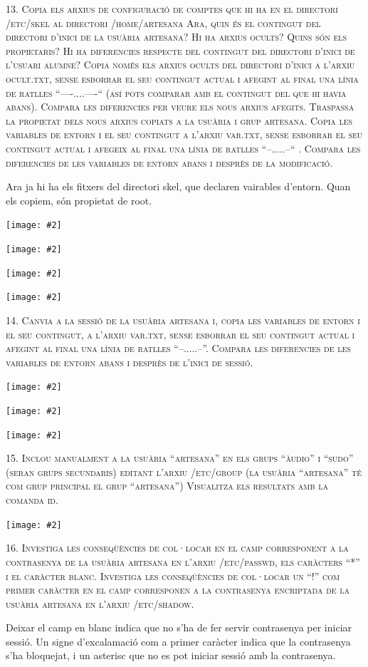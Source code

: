 \documentclass[a4paper,12pt]{article}
\newcommand{\mygraphic}[2][width=\textwidth]{\begin{center}
		\centering\texttt{[image: \#2]}\par
\end{center}}
\begin{document}
\newpage
\textsc{13. Copia els arxius de configuració de comptes que hi ha en el directori /etc/skel al directori /home/artesana Ara, quin és el contingut del directori d’inici de la usuària artesana? Hi ha arxius ocults? Quins són els propietaris? Hi ha diferencies respecte del contingut del directori d’inici de l’usuari alumne? Copia només els arxius ocults del directori d’inici a l’arxiu ocult.txt, sense esborrar el seu contingut actual i afegint al final una línia de ratlles “----....----“ (así pots comparar amb el contingut del que hi havia abans). Compara les diferencies per veure els nous arxius afegits. Traspassa la propietat dels nous arxius copiats a la usuària i grup artesana. Copia les variables de entorn i el seu contingut a l’arxiu var.txt, sense esborrar el seu contingut actual i afegeix al final una línia de ratlles “--.....--“ . Compara les diferencies de les variables de entorn abans i desprès de la modificació.}

Ara ja hi ha els fitxers del directori skel, que declaren vairables d'entorn. Quan els copiem, són propietat de root.
\mygraphic{imatges/13a.png}
\mygraphic{imatges/13b.png}
\mygraphic{imatges/13c.png}
\mygraphic{imatges/13d.png}

\newpage
\textsc{14. Canvia a la sessió de la usuària artesana i, copia les variables de entorn i el seu contingut, a l’arxiu var.txt, sense esborrar el seu contingut actual i afegint al final una línia de ratlles “--.....--”. Compara les diferencies de les variables de entorn abans i desprès de l’inici de sessió.}
\mygraphic{imatges/14a.png}
\mygraphic{imatges/14b.png}
\mygraphic{imatges/14c.png}

\textsc{15. Inclou manualment a la usuària “artesana” en els grups “àu\-dio” i “sudo” (seran grups secundaris) editant l’arxiu /etc/group (la usuària “artesana” té com grup principal el grup “artesana”) Visualitza els resultats amb la comanda id.}
\mygraphic{imatges/15.png}

\newpage
\textsc{16. Investiga les conseqüències de col·locar en el camp corresponent a la contrasenya de la usuària artesana en l’arxiu /etc/passwd, els caràcters “*” i el caràcter blanc. Investiga les conseqüències de col·locar un “!” com primer caràcter en el camp corresponen a la contrasenya encriptada de la usuària artesana en l’arxiu \linebreak /etc/shadow.}

Deixar el camp en blanc indica que no s'ha de fer servir contrasenya per iniciar sessió. Un signe d'excalamació com a primer caràcter indica que la contrasenya s'ha bloquejat, i un asterisc que no es pot iniciar sessió amb la contrasenya.
\end{document}
